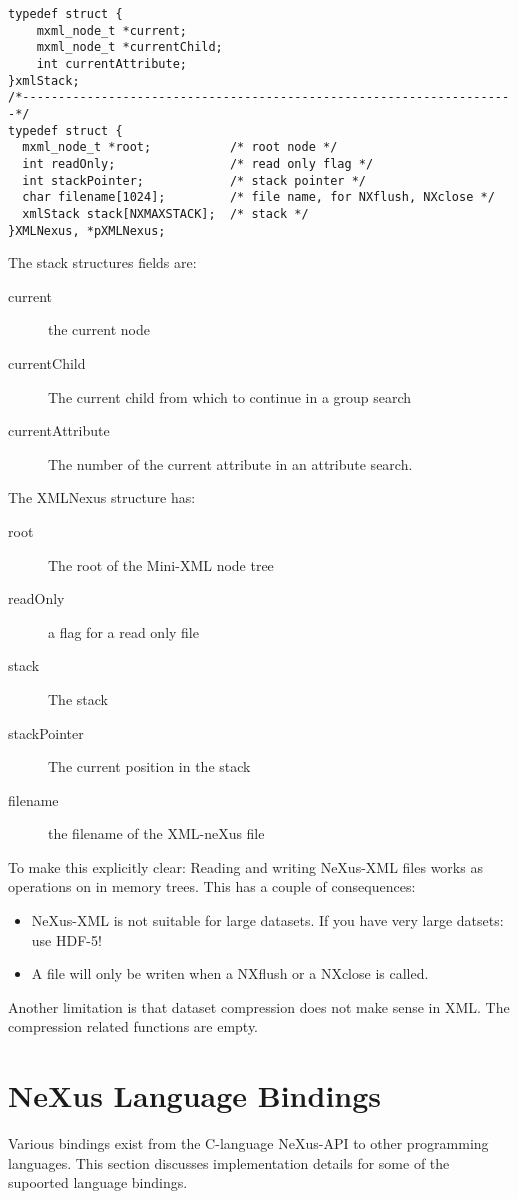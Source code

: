 \documentclass[a4paper]{article}
\begin{document}
\begin{verbatim}
typedef struct {
    mxml_node_t *current;
    mxml_node_t *currentChild;
    int currentAttribute;
}xmlStack;
/*---------------------------------------------------------------------*/
typedef struct {
  mxml_node_t *root;           /* root node */
  int readOnly;                /* read only flag */
  int stackPointer;            /* stack pointer */
  char filename[1024];         /* file name, for NXflush, NXclose */
  xmlStack stack[NXMAXSTACK];  /* stack */
}XMLNexus, *pXMLNexus;
\end{verbatim} 
The stack structures fields are:


\begin{description}\item[current
]  the current node
\item[currentChild
]  The current child from which to continue in a group search
\item[currentAttribute
]  The number of the current attribute in an attribute search.
 
\end{description}The XMLNexus structure has:


\begin{description}\item[root
]  The root of the Mini-XML node tree
\item[readOnly
]  a flag for a read only file
\item[stack
]  The stack
\item[stackPointer
]  The current position in the stack
\item[filename
]  the filename of the XML-neXus file
\end{description}To make this explicitly  clear: Reading and writing NeXus-XML files works as operations on in 
memory trees. This has a couple of consequences:


\begin{itemize}\item NeXus-XML is not suitable for large datasets. If you have very large datsets: use HDF-5!
\item A file will only be writen when a NXflush or a NXclose is called.  
\end{itemize}Another limitation is that dataset compression does not make sense in XML. The 
compression related functions are empty. 


\section{NeXus Language Bindings }
Various bindings exist from the C-language NeXus-API to other programming languages. 
This section discusses implementation details for some of the supoorted language bindings.
\end{document}
